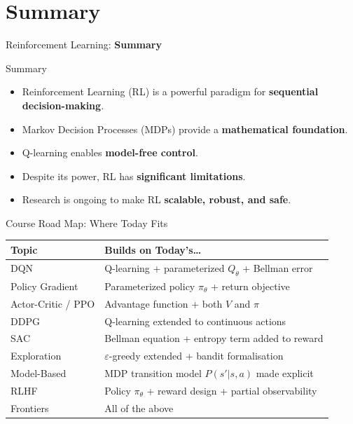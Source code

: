 \section{Summary}
\begin{frame}{}
    \LARGE Reinforcement Learning: \textbf{Summary}
\end{frame}

\begin{frame}{Summary}
    \begin{itemize}
        \item Reinforcement Learning (RL) is a powerful paradigm for \textbf{sequential decision-making}.
        \item Markov Decision Processes (MDPs) provide a \textbf{mathematical foundation}.
        \item Q-learning enables \textbf{model-free control}.
        \item Despite its power, RL has \textbf{significant limitations}.
        \item Research is ongoing to make RL \textbf{scalable, robust, and safe}.
    \end{itemize}
\end{frame}

\begin{frame}{Course Road Map: Where Today Fits}
    \centering
    \begin{tabular}{l l}
    \hline
    \textbf{Topic} & \textbf{Builds on Today's\ldots} \\
    \hline
    DQN & Q-learning + parameterized $Q_\theta$ + Bellman error \\
    Policy Gradient & Parameterized policy $\pi_\theta$ + return objective \\
    Actor-Critic / PPO & Advantage function + both $V$ and $\pi$ \\
    DDPG & Q-learning extended to continuous actions \\
    SAC & Bellman equation + entropy term added to reward \\
    Exploration & $\varepsilon$-greedy extended + bandit formalisation \\
    Model-Based & MDP transition model $P(s'|s,a)$ made explicit \\
    RLHF & Policy $\pi_\theta$ + reward design + partial observability \\
    Frontiers & All of the above \\
    \hline
    \end{tabular}
\end{frame}